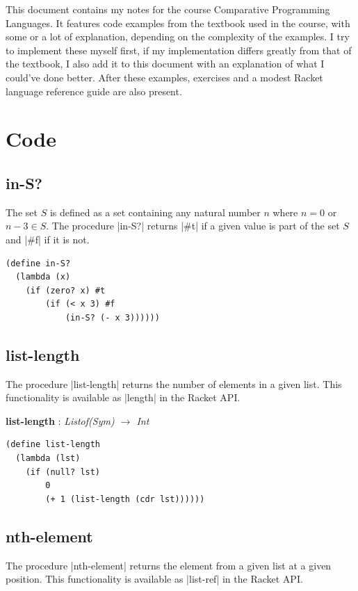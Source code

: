 \documentclass[a4paper]{article}
\begin{document}
This document contains my notes for the course Comparative Programming Languages. It features code examples from the textbook used in the course, with some or a lot of explanation, depending on the complexity of the examples. I try to implement these myself first, if my implementation differs greatly from that of the textbook, I also add it to this document with an explanation of what I could've done better. After these examples, exercises and a modest Racket language reference guide are also present.

\newpage

\section{Code}

\subsection{in-S?}

The set $S$ is defined as a set containing any natural number $n$ where $n = 0$ or $n - 3 \in S$. The procedure |in-S?| returns |#t| if a given value is part of the set $S$ and |#f| if it is not.

\begin{lstlisting}
(define in-S?
  (lambda (x)
    (if (zero? x) #t
        (if (< x 3) #f
            (in-S? (- x 3))))))
\end{lstlisting}

\subsection{list-length}

The procedure |list-length| returns the number of elements in a given list. This functionality is available as |length| in the Racket API.

\textbf{list-length} : \textit{Listof(Sym) $\rightarrow$ Int}
\begin{lstlisting}[aboveskip=0pt]
(define list-length
  (lambda (lst)
    (if (null? lst)
        0
        (+ 1 (list-length (cdr lst))))))
\end{lstlisting}

\subsection{nth-element}

The procedure |nth-element| returns the element from a given list at a given position. This functionality is available as |list-ref| in the Racket API.
\end{document}
